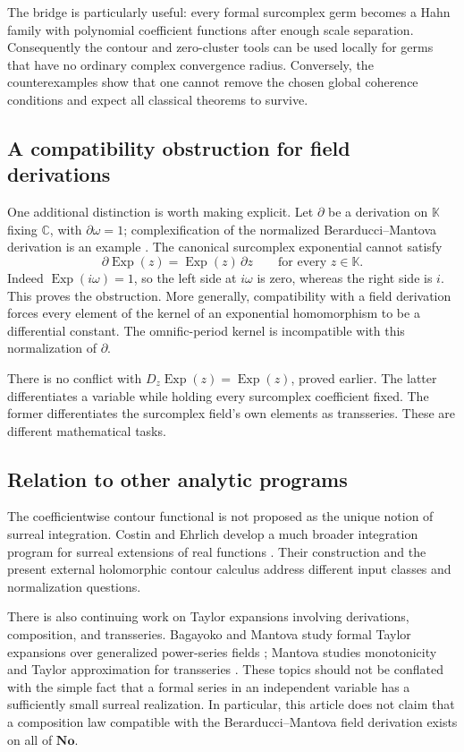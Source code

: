 \documentclass[11pt,letterpaper]{article}
\numberwithin{equation}{section}
\theoremstyle{definition}
\theoremstyle{remark}
\newcommand{\No}{\mathbf{No}}
\newcommand{\K}{\mathbb K}
\newcommand{\C}{\mathbb C}
\DeclareMathOperator{\Exp}{Exp}
\begin{document}
The bridge is particularly useful: every formal surcomplex germ becomes
a Hahn family with polynomial coefficient functions after enough scale
separation. Consequently the contour and zero-cluster tools can be used
locally for germs that have no ordinary complex convergence radius.
Conversely, the counterexamples show that one cannot remove the chosen
global coherence conditions and expect all classical theorems to survive.

\subsection{A compatibility obstruction for field derivations}

One additional distinction is worth making explicit. Let $\partial$
be a derivation on $\K$ fixing $\C$, with $\partial\omega=1$;
complexification of the normalized Berarducci--Mantova derivation is
an example \cite{BMderivations}. The canonical surcomplex exponential
cannot satisfy
\begin{equation}\label{eq:expobstruction}
 \partial\Exp(z)=\Exp(z)\,\partial z\qquad\text{for every }z\in\K.
\end{equation}
Indeed $\Exp(i\omega)=1$, so the left side at $i\omega$ is zero,
whereas the right side is $i$. This proves the obstruction. More
generally, compatibility with a field derivation forces every element
of the kernel of an exponential homomorphism to be a differential
constant. The omnific-period kernel is incompatible with this
normalization of $\partial$.

There is no conflict with $D_z\Exp(z)=\Exp(z)$, proved earlier.
The latter differentiates a variable while holding every surcomplex
coefficient fixed. The former differentiates the surcomplex field's
own elements as transseries. These are different mathematical tasks.

\subsection{Relation to other analytic programs}

The coefficientwise contour functional is not proposed as the unique
notion of surreal integration. Costin and Ehrlich develop a much broader
integration program for surreal extensions of real functions
\cite{CostinEhrlich}. Their construction and the present external
holomorphic contour calculus address different input classes and
normalization questions.

There is also continuing work on Taylor expansions involving derivations,
composition, and transseries. Bagayoko and Mantova study formal Taylor
expansions over generalized power-series fields \cite{BagayokoMantova};
Mantova studies monotonicity and Taylor approximation for transseries
\cite{Mantova2026}. These topics should not be conflated with the simple
fact that a formal series in an independent variable has a sufficiently
small surreal realization. In particular, this article does not claim
that a composition law compatible with the Berarducci--Mantova field
derivation exists on all of $\No$.
\end{document}
